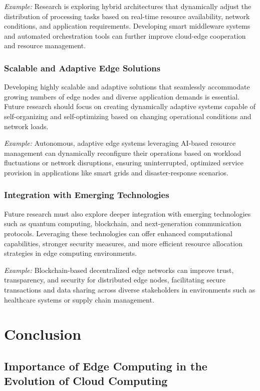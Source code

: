 \documentclass[runningheads]{llncs}
\begin{document}
\noindent\textit{Example:} Research is exploring hybrid architectures that dynamically adjust the distribution of processing tasks based on real-time resource availability, network conditions, and application requirements. Developing smart middleware systems and automated orchestration tools can further improve cloud-edge cooperation and resource management.

\subsubsection{Scalable and Adaptive Edge Solutions}
Developing highly scalable and adaptive solutions that seamlessly accommodate growing numbers of edge nodes and diverse application demands is essential. Future research should focus on creating dynamically adaptive systems capable of self-organizing and self-optimizing based on changing operational conditions and network loads.

\noindent\textit{Example:} Autonomous, adaptive edge systems leveraging AI-based resource management can dynamically reconfigure their operations based on workload fluctuations or network disruptions, ensuring uninterrupted, optimized service provision in applications like smart grids and disaster-response scenarios.

\subsubsection{Integration with Emerging Technologies}
Future research must also explore deeper integration with emerging technologies such as quantum computing, blockchain, and next-generation communication protocols. Leveraging these technologies can offer enhanced computational capabilities, stronger security measures, and more efficient resource allocation strategies in edge computing environments.

\noindent\textit{Example:} Blockchain-based decentralized edge networks can improve trust, transparency, and security for distributed edge nodes, facilitating secure transactions and data sharing across diverse stakeholders in environments such as healthcare systems or supply chain management.

\section{Conclusion}
\subsection{Importance of Edge Computing in the Evolution of Cloud Computing}
\end{document}
